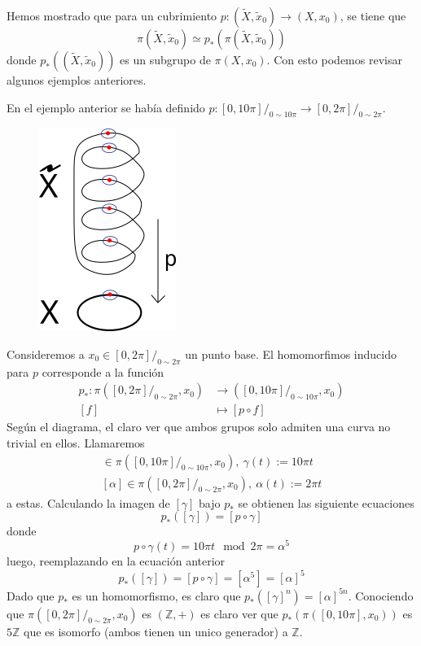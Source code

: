 Hemos mostrado que para un cubrimiento \(p : (\tilde X, \tilde x _0) \to
(X , x_0)\), se tiene que
\[ \pi (\tilde X, \tilde x_0) \simeq p_* \left( \pi (\tilde X, \tilde x_0)\right) \]
donde \(p_* \left( (\tilde X, \tilde x_0) \right)\) es un subgrupo de
\(\pi (X, x_0)\). Con esto podemos revisar algunos ejemplos anteriores.
\begin{ejemplo}
  En el ejemplo anterior se había definido \(p : [0 , 10 \pi] /_{0 \sim
    10\pi} \to [0, 2\pi] /_{0 \sim 2\pi}\).
  \begin{figure}[h]
    \centering \includegraphics[scale=0.5]{./imagenes/spring.png}
  \end{figure}
  Consideremos a \(x_0 \in [0, 2\pi] /_{0 \sim 2\pi}\) un punto base. El
  homomorfimos inducido para \(p\) corresponde a la función
  \begin{align*}
    p_* : \pi \left( [0, 2\pi] /_{0 \sim 2\pi} , x_0 \right) &\longrightarrow \left( [0, 10\pi] /_{0 \sim 10\pi}, x_0 \right) \\
    [f] &\longmapsto [p \circ f]
  \end{align*}
  Según el diagrama, el claro ver que ambos grupos solo admiten una
  curva no trivial en ellos. Llamaremos
  \begin{gather*}
    [\gamma] \in \pi \left( [0, 10\pi] /_{0 \sim 10\pi}, x_0 \right),\
    \gamma (t) := 10 \pi t \\
    [\alpha] \in \pi \left( [0, 2\pi] /_{0 \sim 2\pi}, x_0 \right), \
    \alpha (t) := 2 \pi t
  \end{gather*}
  a estas. Calculando la imagen de \([\gamma]\) bajo \(p_*\) se obtienen
  las siguiente ecuaciones
  \begin{equation*}
    p_* \left( [\gamma] \right) = [p \circ \gamma]
  \end{equation*}
  donde
  \[
    p \circ \gamma (t) = 10 \pi t \mod 2 \pi = \alpha^5
  \]
  luego, reemplazando en la ecuación anterior
  \begin{equation*}
    p_* \left( [\gamma] \right) = [p \circ \gamma] = [\alpha^5] =
    [\alpha]^5
  \end{equation*}
  Dado que \(p_*\) es un homomorfismo, es claro que \(p_* \left(
  [\gamma]^n \right) = [\alpha]^{5n}\). Conociendo que \(\pi \left(
  [0,2\pi] /_{0 \sim 2\pi} , x_0 \right)\) es \((\mathbb Z, +)\) es claro
  ver que \(p_* \left( \pi \left( [0, 10\pi] , x_0 \right) \right)\) es
  \(5 \mathbb Z \) que es isomorfo (ambos tienen un unico generador) a
  \(\mathbb Z\).
\end{ejemplo}

